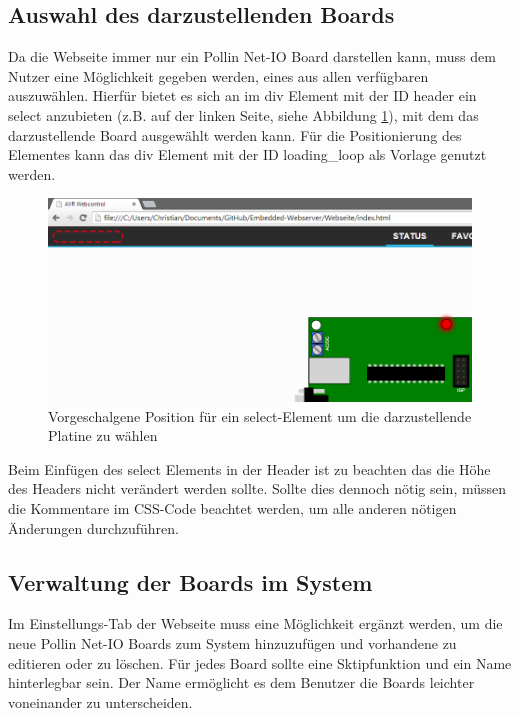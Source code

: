\subsection{Auswahl des darzustellenden Boards}
\label{auswahl_board}
Da die Webseite immer nur ein Pollin Net-IO Board darstellen kann, muss dem
Nutzer eine Möglichkeit gegeben werden, eines aus allen verfügbaren auszuwählen.
Hierfür bietet es sich an im \textrm{div} Element mit der ID \textrm{header}
ein \textrm{select} anzubieten (z.B. auf der linken Seite, siehe
Abbildung \ref{select_board}), mit dem das darzustellende Board ausgewählt
werden kann.
Für die Positionierung des Elementes kann das \textrm{div} Element mit der ID
\textrm{loading\_loop} als Vorlage genutzt werden.

\begin{figure}[H]
\centering
\includegraphics[width=13cm]{content/pictures/select_board.png}
\caption{Vorgeschalgene Position für ein select-Element um die darzustellende
Platine zu wählen}
\label{select_board}
\end{figure}

Beim Einfügen des \textrm{select} Elements in der Header ist zu beachten das die
Höhe des Headers nicht verändert werden sollte. Sollte dies dennoch nötig sein,
müssen die Kommentare im CSS-Code beachtet werden, um alle anderen nötigen
Änderungen durchzuführen.

\subsection{Verwaltung der Boards im System}
\label{verwaltung_system}
Im Einstellungs-Tab der Webseite muss eine Möglichkeit ergänzt werden, um die
neue Pollin Net-IO Boards zum System hinzuzufügen und vorhandene zu editieren
oder zu löschen. Für jedes Board sollte eine Sktipfunktion und ein Name
hinterlegbar sein. Der Name ermöglicht es dem Benutzer die Boards leichter
voneinander zu unterscheiden.

